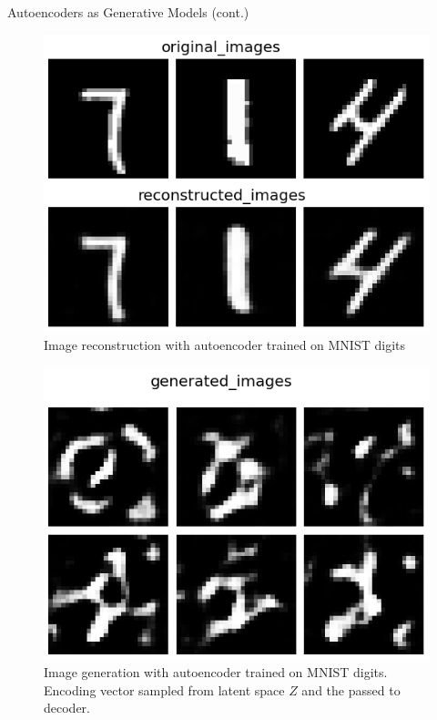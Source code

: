 \begin{frame}[allowframebreaks]{Autoencoders as Generative Models (cont.)}
\begin{figure}
    \centering
    \includegraphics[height=0.8\textheight, width=\textwidth, keepaspectratio]{images/autoencoders/example_reconstruct.png}
    \caption*{Image reconstruction with autoencoder trained on MNIST digits}
\end{figure}

\framebreak
\begin{figure}
    \centering
    \includegraphics[height=0.75\textheight, width=\textwidth, keepaspectratio]{images/autoencoders/example_generative.png}
    \caption*{Image generation with autoencoder trained on MNIST digits. Encoding vector sampled from latent space $Z$ and the passed to decoder.}
\end{figure}

\end{frame}